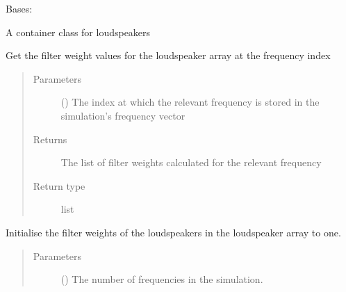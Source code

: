 \documentclass[letterpaper,10pt,english]{sphinxmanual}
\begin{document}
\begin{fulllineitems}
\label{\detokenize{source/pyzones:pyzones.LoudspeakerArray}}
Bases: {\hyperref[\detokenize{source/pyzones:pyzones.SoundObjectArray}]{}}

A container class for loudspeakers

\begin{fulllineitems}
\label{\detokenize{source/pyzones:pyzones.LoudspeakerArray.get_q}}
Get the filter weight values for the loudspeaker array at the frequency index
\begin{quote}\begin{description}
\item[{Parameters}] \leavevmode
{} () \textendash{} The index at which the relevant frequency is stored in the simulation’s frequency vector

\item[{Returns}] \leavevmode
The list of filter weights calculated for the relevant frequency

\item[{Return type}] \leavevmode
list

\end{description}\end{quote}

\end{fulllineitems}


\begin{fulllineitems}
\label{\detokenize{source/pyzones:pyzones.LoudspeakerArray.initialise_q}}
Initialise the filter weights of the loudspeakers in the loudspeaker array to one.
\begin{quote}\begin{description}
\item[{Parameters}] \leavevmode
{} () \textendash{} The number of frequencies in the simulation.


\end{description}
\end{quote}
\end{fulllineitems}
\end{fulllineitems}
\end{document}
